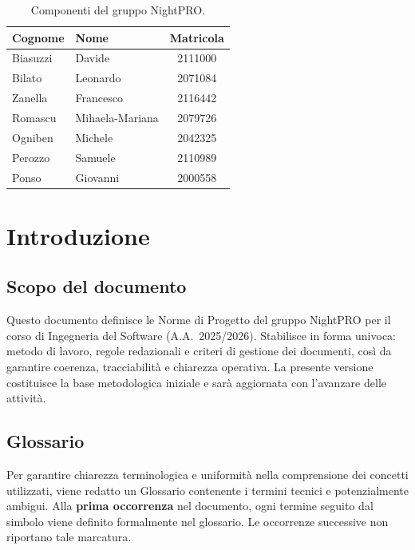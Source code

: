 \documentclass[a4paper, 11pt, oneside]{scrartcl} %
\begin{document}
\begin{table}[h!]
\centering
\renewcommand{\arraystretch}{1.2} %
\begin{tabular}{@{}llc@{}}
\toprule
\textbf{Cognome} & \textbf{Nome} & \textbf{Matricola} \\
\midrule
Biasuzzi & Davide & 2111000 \\
Bilato & Leonardo & 2071084 \\
Zanella & Francesco & 2116442 \\
Romascu & Mihaela-Mariana & 2079726 \\
Ogniben & Michele & 2042325 \\
Perozzo & Samuele & 2110989 \\
Ponso & Giovanni & 2000558 \\
\bottomrule
\end{tabular}
\caption{Componenti del gruppo NightPRO.}
\end{table}


\newpage
\section{Introduzione}
\label{sec:introduzione}

\subsection{Scopo del documento}
Questo documento definisce le Norme di Progetto{\scriptsize{}} del gruppo NightPRO per il corso di Ingegneria del Software (A.A.~2025/2026).
Stabilisce in forma univoca: metodo di lavoro, regole redazionali e criteri di gestione dei documenti, così da garantire coerenza, tracciabilità e chiarezza operativa.
La presente versione costituisce la base metodologica iniziale e sarà aggiornata con l’avanzare delle attività.


\subsection{Glossario}

Per garantire chiarezza terminologica e uniformità nella comprensione dei concetti utilizzati, viene redatto un Glossario{\scriptsize{}} contenente i termini tecnici e potenzialmente ambigui.
Alla \textbf{prima occorrenza} nel documento, ogni termine seguito dal simbolo {\scriptsize{}} viene definito formalmente nel glossario.
Le occorrenze successive non riportano tale marcatura.
\end{document}
